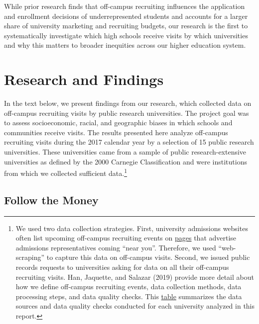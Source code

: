\documentclass{article}
\begin{document}
While prior research finds that off-campus recruiting influences the application and enrollment decisions of underrepresented students and accounts for a larger share of university marketing and recruiting budgets, our research is the first to systematically investigate which high schools receive visits by which universities and why this matters to broader inequities across our higher education system.

\section*{Research and Findings}

In the text below, we present findings from our research, which collected data on off-campus recruiting visits by public research universities. The project goal was to assess socioeconomic, racial, and geographic biases in which schools and communities receive visits. The results presented here analyze off-campus recruiting visits during the 2017 calendar year by a selection of 15 public research universities. These universities came from a sample of public research-extensive universities as defined by the 2000 Carnegie Classification and were institutions from which we collected sufficient data.\footnote{We used two data collection strategies. First, university admissions websites often list upcoming off-campus recruiting events on \href{https://cyouh95.github.io/third-way-report/assets/html/uga.html}{pages} that advertise admissions representatives coming ``near you''. Therefore, we used ``web-scraping'' to capture this data on off-campus visits. Second, we issued public records requests to universities asking for data on all their off-campus recruiting visits. Han, Jaquette, and Salazar (2019) provide more detail about how we define off-campus recruiting events, data collection methods, data processing steps, and data quality checks. This \href{https://ozanj.github.io/joyce_report/\#/slide-4}{table} summarizes the data sources and data quality checks conducted for each university analyzed in this report.}

\subsection*{Follow the Money}
\end{document}
